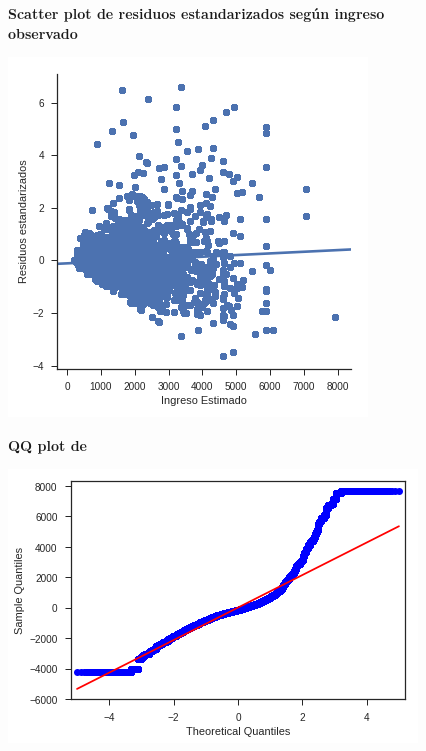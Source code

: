      \begin{figure}[!htb]
     	\centering
     	\textbf{Scatter plot de residuos estandarizados según ingreso observado}\par\medskip
     	\includegraphics[scale = 0.4]{../img/capitulo3/evalCapecoVipcf2.png}
     	\caption{}
     	\label{fig:evalCapecoVipcf2.png}
     \end{figure}
     
     \begin{figure}[!htb]
     	\centering
     	\textbf{QQ plot de}\par\medskip
     	\includegraphics[scale = 0.4]{../img/capitulo3/evalCapecoVipcf3.png}
     	\caption{}
     	\label{fig:evalCapecoVipcf3.png}
     \end{figure}     
     

